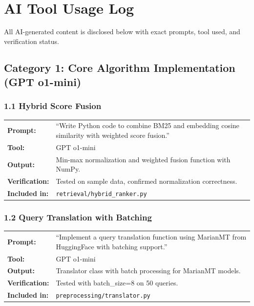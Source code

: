 \documentclass[12pt,a4paper]{article}
\begin{document}
\newpage
\appendix

\section{AI Tool Usage Log}
\label{appendix:ai_usage}

All AI-generated content is disclosed below with exact prompts, tool used, and verification status.

\subsection*{Category 1: Core Algorithm Implementation (GPT o1-mini)}

\subsubsection*{1.1 Hybrid Score Fusion}
\begin{tabular}{p{3.2cm}p{9.5cm}}
\textbf{Prompt:}        & ``Write Python code to combine BM25 and embedding cosine similarity with weighted score fusion.'' \\
\textbf{Tool:}          & GPT o1-mini \\
\textbf{Output:}        & Min-max normalization and weighted fusion function with NumPy. \\
\textbf{Verification:}  & Tested on sample data, confirmed normalization correctness. \\
\textbf{Included in:}   & \texttt{retrieval/hybrid\_ranker.py} \\
\end{tabular}

\subsubsection*{1.2 Query Translation with Batching}
\begin{tabular}{p{3.2cm}p{9.5cm}}
\textbf{Prompt:}        & ``Implement a query translation function using MarianMT from HuggingFace with batching support.'' \\
\textbf{Tool:}          & GPT o1-mini \\
\textbf{Output:}        & Translator class with batch processing for MarianMT models. \\
\textbf{Verification:}  & Tested with batch\_size=8 on 50 queries. \\
\textbf{Included in:}   & \texttt{preprocessing/translator.py} \\
\end{tabular}
\end{document}
